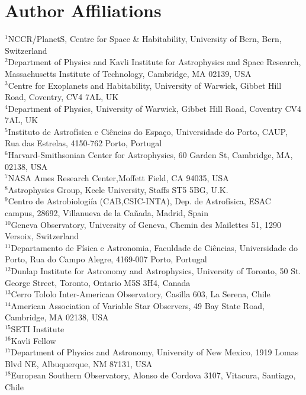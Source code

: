 \documentclass[fleqn,usenatbib]{mnras}
\begin{document}
\section{Author Affiliations}\label{sec:affiliations}
$^{1}$NCCR/PlanetS, Centre for Space \& Habitability, University of Bern, Bern, Switzerland\\
$^{2}$Department of Physics and Kavli Institute for Astrophysics and Space Research, Massachusetts Institute of Technology, Cambridge, MA 02139, USA\\
$^{3}$Centre for Exoplanets and Habitability, University of Warwick, Gibbet Hill Road, Coventry, CV4 7AL, UK\\
$^{4}$Department of Physics, University of Warwick, Gibbet Hill Road, Coventry CV4 7AL, UK\\
$^{5}$Instituto de Astrof\'isica e Ci\^encias do Espa\c{c}o, Universidade do Porto, CAUP, Rua das Estrelas, 4150-762 Porto, Portugal\\
$^{6}$Harvard-Smithsonian Center for Astrophysics, 60 Garden St, Cambridge, MA, 02138, USA\\
$^{7}$NASA Ames Research Center,Moffett Field, CA 94035, USA\\
$^{8}$Astrophysics Group, Keele University, Staffs ST5 5BG, U.K. \\
$^{9}$Centro de Astrobiologi\'ia (CAB,CSIC-INTA), Dep. de Astrof\'isica, ESAC campus, 28692, Villanueva de la Ca\~nada, Madrid, Spain\\
$^{10}$Geneva Observatory, University of Geneva, Chemin des Mailettes 51, 1290 Versoix, Switzerland\\
$^{11}$Departamento de F\'isica e Astronomia, Faculdade de Ci\^{e}ncias, Universidade do Porto, Rua do Campo Alegre, 4169-007 Porto, Portugal\\
$^{12}$Dunlap Institute for Astronomy and Astrophysics, University of Toronto, 50 St. George Street, Toronto, Ontario M5S 3H4, Canada\\
$^{13}$Cerro Tololo Inter-American Observatory, Casilla 603, La Serena, Chile\\
$^{14}$American Association of Variable Star Observers, 49 Bay State Road, Cambridge, MA 02138, USA\\
$^{15}$SETI Institute\\
$^{16}$Kavli Fellow\\
$^{17}$Department of Physics and Astronomy, University of New Mexico, 1919 Lomas Blvd NE, Albuquerque, NM 87131, USA\\
$^{18}$European Southern Observatory, Alonso de Cordova 3107, Vitacura, Santiago, Chile\\
\end{document}
